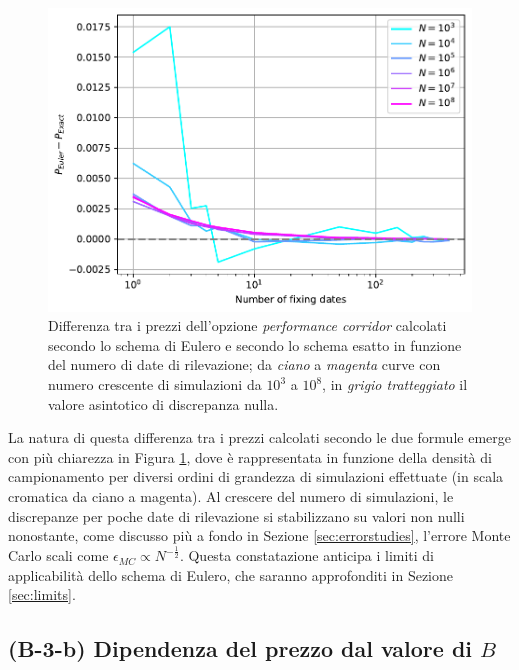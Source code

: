 \begin{figure}[t]
    \centering
    \includegraphics[scale=0.5]{graphs/OptionPriceVsM_DiscrepancyVsM_WithDifferentNs.pdf}
    \caption[Differenza tra i prezzi dell'opzione \textit{performance corridor} calcolati secondo lo schema di Eulero e secondo lo schema esatto in funzione del numero di date di rilevazione.]{Differenza tra i prezzi dell'opzione \textit{performance corridor} calcolati secondo lo schema di Eulero e secondo lo schema esatto in funzione del numero di date di rilevazione; da \textit{ciano} a \textit{magenta} curve con numero crescente di simulazioni da ${10}^3$ a ${10}^8$, in \textit{grigio tratteggiato} il valore asintotico di discrepanza nulla.}
    \label{fig:ex_eul_discrep_M}
\end{figure}

La natura di questa differenza tra i prezzi calcolati secondo le due formule emerge con più chiarezza in Figura \ref{fig:ex_eul_discrep_M}, dove è rappresentata in funzione della densità di campionamento per diversi ordini di grandezza di simulazioni effettuate (in scala cromatica da ciano a magenta). Al crescere del numero di simulazioni, le discrepanze per poche date di rilevazione si stabilizzano su valori non nulli nonostante, come discusso più a fondo in Sezione \ref{sec:errorstudies}, l'errore Monte Carlo scali come $\epsilon_{MC}\propto N^{-\frac{1}{2}}$. Questa constatazione anticipa i limiti di applicabilità dello schema di Eulero, che saranno approfonditi in Sezione \ref{sec:limits}.

\subsection{(B-3-b) Dipendenza del prezzo dal valore di \texorpdfstring{$B$}{B}}

